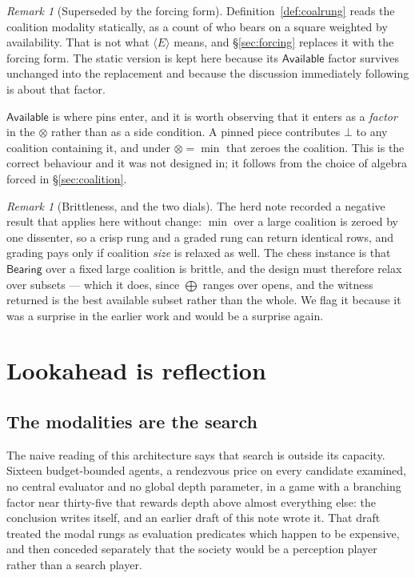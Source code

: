 \documentclass[11pt,a4paper]{article}
\theoremstyle{plain}
\theoremstyle{definition}
\theoremstyle{remark}
\newtheorem{remark}[theorem]{Remark}
\begin{document}
\begin{remark}[Superseded by the forcing form]
\label{rem:supersede}
Definition~\ref{def:coalrung} reads the coalition modality statically, as a
count of who bears on a square weighted by availability. That is not what
$\langle E\rangle$ means, and \S\ref{sec:forcing} replaces it with the forcing
form. The static version is kept here because its $\mathsf{Available}$ factor
survives unchanged into the replacement and because the discussion immediately
following is about that factor.
\end{remark}

$\mathsf{Available}$ is where pins enter, and it is worth observing that it
enters as a \emph{factor} in the $\otimes$ rather than as a side condition. A
pinned piece contributes $\bot$ to any coalition containing it, and under
$\otimes = \min$ that zeroes the coalition. This is the correct behaviour and it
was not designed in; it follows from the choice of algebra forced in
\S\ref{sec:coalition}.

\begin{remark}[Brittleness, and the two dials]
\label{rem:brittle}
The herd note recorded a negative result that applies here without change: $\min$
over a large coalition is zeroed by one dissenter, so a crisp rung and a graded
rung can return identical rows, and grading pays only if coalition \emph{size}
is relaxed as well. The chess instance is that $\mathsf{Bearing}$ over a fixed
large coalition is brittle, and the design must therefore relax over subsets ---
which it does, since $\bigoplus$ ranges over opens, and the witness returned is
the best available subset rather than the whole. We flag it because it was a
surprise in the earlier work and would be a surprise again.
\end{remark}

\section{Lookahead is reflection}
\label{sec:look}

\subsection{The modalities are the search}

The naive reading of this architecture says that search is outside its capacity.
Sixteen budget-bounded agents, a rendezvous price on every candidate examined, no
central evaluator and no global depth parameter, in a game with a branching
factor near thirty-five that rewards depth above almost everything else: the
conclusion writes itself, and an earlier draft of this note wrote it. That draft
treated the modal rungs as evaluation predicates which happen to be expensive,
and then conceded separately that the society would be a perception player rather
than a search player.
\end{document}
